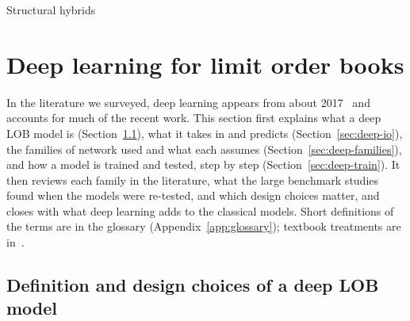 \begin{modelcard}{Structural hybrids}
\end{modelcard}


\section{Deep learning for limit order books}
\label{sec:deep}

In the literature we surveyed, deep learning appears from about 2017~\citep{tsantekidis2017} and accounts for
much of the recent work. This
section first explains what a deep LOB model is (Section~\ref{sec:deep-what}), what it takes in and predicts
(Section~\ref{sec:deep-io}), the families of network used and what each assumes (Section~\ref{sec:deep-families}),
and how a model is trained and tested, step by step (Section~\ref{sec:deep-train}). It then reviews each family in
the literature, what the large benchmark studies found when the models were re-tested, and which design choices
matter, and closes with what deep learning adds to the classical models. Short definitions of the terms are in the
glossary (Appendix~\ref{app:glossary}); textbook treatments are in~\citet{goodfellow2016}.

\subsection{Definition and design choices of a deep LOB model}
\label{sec:deep-what}

